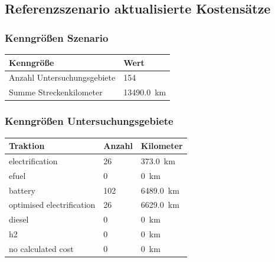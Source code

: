 \subsection{Referenzszenario aktualisierte Kostensätze}

\subsubsection{Kenngrößen Szenario}

\begin{center}
	\begin{tabularx}{\textwidth}{X | X } Kenngröße & Wert \\
	\hline
	Anzahl Untersuchungsgebiete & \num{154} \\
	Summe Streckenkilometer & \SI{13490.0}{\km}
	\end{tabularx}
\end{center}

\subsubsection{Kenngrößen Untersuchungsgebiete}
\begin{center}
	\begin{tabularx}{\textwidth}{X | X | X} Traktion & Anzahl & Kilometer \\
	\hline
            electrification & \num{26} &  \SI{373.0}{\km}\\
            efuel & \num{0} &  \SI{0}{\km}\\
            battery & \num{102} &  \SI{6489.0}{\km}\\
            optimised electrification & \num{26} &  \SI{6629.0}{\km}\\
            diesel & \num{0} &  \SI{0}{\km}\\
            h2 & \num{0} &  \SI{0}{\km}\\
            no calculated cost & \num{0} &  \SI{0}{\km}\\
    	\end{tabularx}
\end{center}

